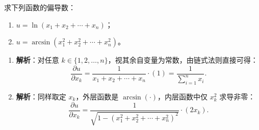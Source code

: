 \documentclass[lang=cn,11pt]{elegantbook}
\begin{document}
\begin{exercise}[多元复合函数的偏导数]
求下列函数的偏导数：
\begin{enumerate}
  \item[(1)] $u = \ln(x_1+x_2+\cdots+x_n)$；
  \item[(2)] $u = \arcsin(x_1^2+x_2^2+\cdots+x_n^2)$。
\end{enumerate}
\end{exercise}
\begin{solution}
\begin{enumerate}
  \item[(1)] \textbf{解析}：对任意 $k \in \{1,2,\dots,n\}$，视其余自变量为常数，由链式法则直接可得：
  \[
  \frac{\partial u}{\partial x_k} = \frac{1}{x_1+x_2+\cdots+x_n} \cdot (1) = \frac{1}{\sum_{i=1}^n x_i}.
  \]
  
  \item[(2)] \textbf{解析}：同样取定 $x_k$，外层函数是 $\arcsin(\cdot)$，内层函数中仅 $x_k^2$ 求导非零：
  \[
  \frac{\partial u}{\partial x_k} = \frac{1}{\sqrt{1 - (x_1^2+x_2^2+\cdots+x_n^2)^2}} \cdot (2x_k).
  \]
\end{enumerate}
\end{solution}
\end{document}
